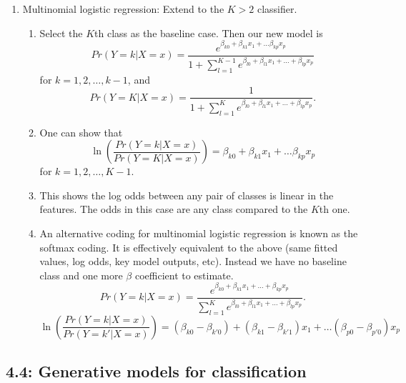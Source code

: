 \documentclass{article}
\begin{document}
\begin{enumerate}
\item Multinomial logistic regression: Extend to the $K>2$ classifier.
\begin{enumerate}
\item Select the $K$th class as the baseline case. Then our new model is
\[
Pr(Y=k | X=x) = \frac{e^{\beta_{k0} + \beta_{k1} x_1 + \dots \beta_{kp}x_p}}{1+ \sum_{l=1}^{K-1} e^{\beta_{l0}+\beta_{l1}x_1 + \dots + \beta_{lp}x_p}}
\]
for $k=1,2,\dots,k-1$, and
\[
Pr(Y=K | X=x) = \frac{1}{1+ \sum_{l=1}^{K} e^{\beta_{l0}+\beta_{l1}x_1 + \dots + \beta_{lp}x_p}}.
\]
\item One can show that
\[
\ln \left(\frac{Pr(Y=k|X=x)}{Pr(Y=K|X=x)} \right) = \beta_{k0} + \beta_{k1} x_1 + \dots \beta_{kp}x_p
\]
for $k=1,2, \dots, K-1$.
\item This shows the log odds between any pair of classes is linear in the features. The odds in this case are any class compared to the $K$th one.
\item An alternative coding for multinomial logistic regression is known as the softmax coding. It is effectively equivalent to the above (same fitted values, log odds, key model outputs, etc). Instead we have no baseline class and one more $\beta$ coefficient to estimate.
\[
Pr(Y=k | X=x) = \frac{e^{\beta_{k0}+\beta_{k1}x_1 + \dots + \beta_{kp}x_p}}{\sum_{l=1}^{K} e^{\beta_{l0}+\beta_{l1}x_1 + \dots + \beta_{lp}x_p}}.
\]
\[
\ln \left(\frac{Pr(Y=k|X=x)}{Pr(Y=k'|X=x)} \right) = (\beta_{k0}-\beta_{k'0}) + (\beta_{k1}-\beta_{k'1}) x_1 + \dots (\beta_{p0}-\beta_{p'0})x_p
\]

\end{enumerate}
\end{enumerate}

\subsection*{4.4: Generative models for classification}
\end{document}
